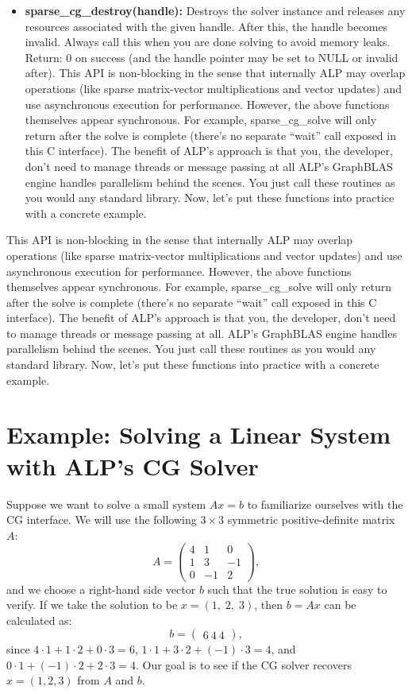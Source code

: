 \begin{itemize}
\item \textbf{sparse\_cg\_destroy(handle):} Destroys the solver instance and releases any resources associated with the given handle. After this, the handle becomes invalid. Always call this when you are done solving to avoid memory leaks. Return: 0 on success (and the handle pointer may be set to NULL or invalid after). This API is non-blocking in the sense that internally ALP may overlap operations (like sparse matrix-vector multiplications and vector updates) and use asynchronous execution for performance. However, the above functions themselves appear synchronous. For example, sparse\_cg\_solve will only return after the solve is complete (there’s no separate “wait” call exposed in this C interface). The benefit of ALP’s approach is that you, the developer, don’t need to manage threads or message passing at all ALP’s GraphBLAS engine handles parallelism behind the scenes. You just call these routines as you would any standard library. Now, let’s put these functions into practice with a concrete example.
\end{itemize}

This API is non-blocking in the sense that internally ALP may overlap operations (like sparse matrix-vector multiplications and vector updates) and use asynchronous execution for performance. However, the above functions themselves appear synchronous. For example, sparse\_cg\_solve will only return after the solve is complete (there’s no separate “wait” call exposed in this C interface). The benefit of ALP’s approach is that you, the developer, don’t need to manage threads or message passing at all. ALP’s GraphBLAS engine handles parallelism behind the scenes. You just call these routines as you would any standard library. Now, let’s put these functions into practice with a concrete example.

  
\section*{Example: Solving a Linear System with ALP’s CG Solver}

Suppose we want to solve a small system $Ax = b$ to familiarize ourselves with the CG interface. We will use the following $3 \times 3$ symmetric positive-definite matrix $A$: $$ A = \begin{pmatrix} 4 & 1 & 0\\ 
        1 & 3 & -1\\ 
        0 & -1 & 2 \end{pmatrix}, $$ 
        and we choose a right-hand side vector $b$ such that the true solution is easy to verify. If we take the solution to be $x = (1,\;2,\;3)$, then $b = A x$ can be calculated as: $$ b = \begin{pmatrix}6 \ 4 \ 4 \end{pmatrix}, $$ since $4\cdot1 + 1\cdot2 + 0\cdot3 = 6$, $1\cdot1 + 3\cdot2 + (-1)\cdot3 = 4$, and $0\cdot1 + (-1)\cdot2 + 2\cdot3 = 4$. Our goal is to see if the CG solver recovers $x = (1,2,3)$ from $A$ and $b$. 
        
